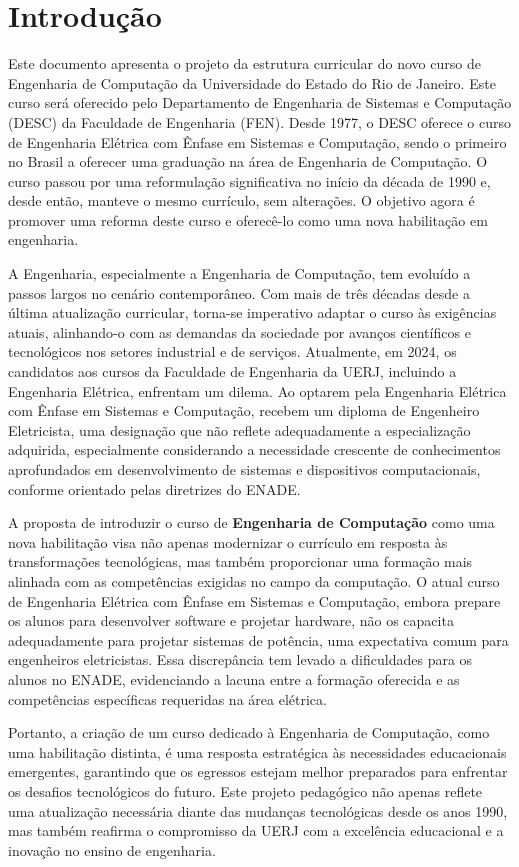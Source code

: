 \chapter{Introdução}
\label{intro} %

Este documento apresenta o projeto da estrutura curricular do novo curso de Engenharia de Computação da Universidade do Estado do Rio de Janeiro. Este curso será oferecido pelo Departamento de Engenharia de Sistemas e Computação (DESC) da Faculdade de Engenharia (FEN). Desde 1977, o DESC oferece o curso de Engenharia Elétrica com Ênfase em Sistemas e Computação, sendo o primeiro no Brasil a oferecer uma graduação na área de Engenharia de Computação. O curso passou por uma reformulação significativa no início da década de 1990 e, desde então, manteve o mesmo currículo, sem alterações. O objetivo agora é promover uma reforma deste curso e oferecê-lo como uma nova habilitação em engenharia.

A Engenharia, especialmente a Engenharia de Computação, tem evoluído a passos largos no cenário contemporâneo. Com mais de três décadas desde a última atualização curricular, torna-se imperativo adaptar o curso às exigências atuais, alinhando-o com as demandas da sociedade por avanços científicos e tecnológicos nos setores industrial e de serviços. Atualmente, em 2024, os candidatos aos cursos da Faculdade de Engenharia da UERJ, incluindo a Engenharia Elétrica, enfrentam um dilema. Ao optarem pela Engenharia Elétrica com Ênfase em Sistemas e Computação, recebem um diploma de Engenheiro Eletricista, uma designação que não reflete adequadamente a especialização adquirida, especialmente considerando a necessidade crescente de conhecimentos aprofundados em desenvolvimento de sistemas e dispositivos computacionais, conforme orientado pelas diretrizes do ENADE.

A proposta de introduzir o curso de \textbf{Engenharia de Computação} como uma nova habilitação visa não apenas modernizar o currículo em resposta às transformações tecnológicas, mas também proporcionar uma formação mais alinhada com as competências exigidas no campo da computação. O atual curso de Engenharia Elétrica com Ênfase em Sistemas e Computação, embora prepare os alunos para desenvolver software e projetar hardware, não os capacita adequadamente para projetar sistemas de potência, uma expectativa comum para engenheiros eletricistas. Essa discrepância tem levado a dificuldades para os alunos no ENADE, evidenciando a lacuna entre a formação oferecida e as competências específicas requeridas na área elétrica.

Portanto, a criação de um curso dedicado à Engenharia de Computação, como uma habilitação distinta, é uma resposta estratégica às necessidades educacionais emergentes, garantindo que os egressos estejam melhor preparados para enfrentar os desafios tecnológicos do futuro. Este projeto pedagógico não apenas reflete uma atualização necessária diante das mudanças tecnológicas desde os anos 1990, mas também reafirma o compromisso da UERJ com a excelência educacional e a inovação no ensino de engenharia.
